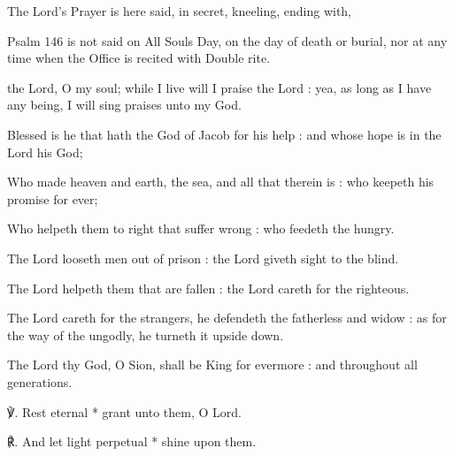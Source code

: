 \begin{rubric}
    {The Lord's Prayer is here said, in secret, kneeling, ending with,}
\end{rubric}

\begin{rubric}
{Psalm 146 is not said on All Souls Day, on the day of death or burial, nor at any time when the Office is recited with Double rite.}
\end{rubric}
 the Lord, O my soul; while I live will I praise the Lord : yea, as long as I have any being, I will sing praises unto my God.\par
{}
Blessed is he that hath the God of Jacob for his help : and whose hope is in the Lord his God;\par
{}Who made heaven and earth, the sea, and all that therein is : who keepeth his promise for ever;\par
{}Who helpeth them to right that suffer wrong : who feedeth the hungry.\par
{}The Lord looseth men out of prison : the Lord giveth sight to the blind.\par
{}The Lord helpeth them that are fallen : the Lord careth for the righteous.\par
{}The Lord careth for the strangers, he defendeth the fatherless and widow : as for the way of the ungodly, he turneth it upside down.\par
{}The Lord thy God, O Sion, shall be King for evermore : and throughout all generations.
\par
℣. Rest eternal * grant unto them, O Lord.\par
℟. And let light perpetual * shine upon them.

